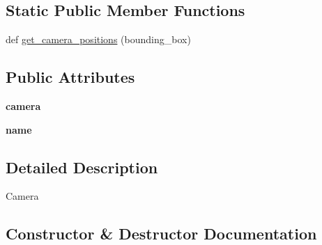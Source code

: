\subsection*{Static Public Member Functions}
\begin{DoxyCompactItemize}
\item 
def \hyperlink{classmeshy_1_1neuromorphovis_1_1rendering_1_1camera_1_1camera_1_1Camera_a493030694b8a65eca300b2ad9be04111}{get\+\_\+camera\+\_\+positions} (bounding\+\_\+box)
\end{DoxyCompactItemize}
\subsection*{Public Attributes}
\begin{DoxyCompactItemize}
\item 
{\bfseries camera}\hypertarget{classmeshy_1_1neuromorphovis_1_1rendering_1_1camera_1_1camera_1_1Camera_a2041e9cc9fce18cb57672504fb7b2140}{}\label{classmeshy_1_1neuromorphovis_1_1rendering_1_1camera_1_1camera_1_1Camera_a2041e9cc9fce18cb57672504fb7b2140}

\item 
{\bfseries name}\hypertarget{classmeshy_1_1neuromorphovis_1_1rendering_1_1camera_1_1camera_1_1Camera_a32f3b8680d6c5961f9c33d531d70dba8}{}\label{classmeshy_1_1neuromorphovis_1_1rendering_1_1camera_1_1camera_1_1Camera_a32f3b8680d6c5961f9c33d531d70dba8}

\end{DoxyCompactItemize}


\subsection{Detailed Description}


\begin{DoxyVerb}Camera
\end{DoxyVerb}
 

\subsection{Constructor \& Destructor Documentation}
